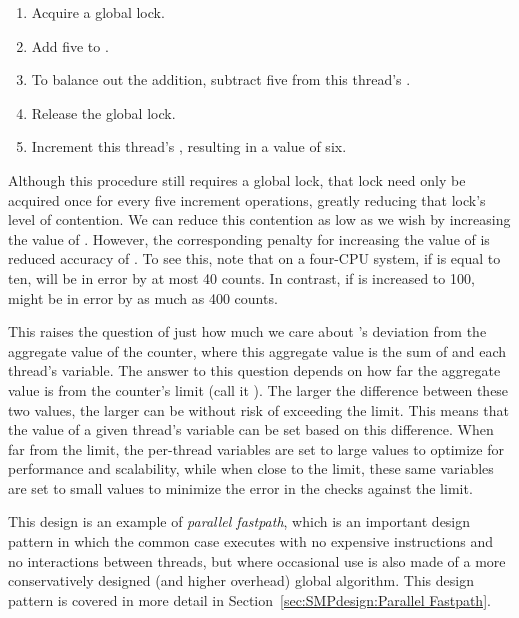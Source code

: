 \begin{enumerate}
\item	Acquire a global lock.
\item	Add five to .
\item	To balance out the addition, subtract five from this
	thread's .
\item	Release the global lock.
\item	Increment this thread's , resulting in a value of six.
\end{enumerate}

Although this procedure still requires a global lock, that lock need only be
acquired once for every five increment operations, greatly reducing
that lock's level of contention.
We can reduce this contention as low as we wish by increasing the
value of .
However, the corresponding penalty for increasing the value of
 is reduced accuracy of .
To see this, note that on a four-CPU system, if 
is equal to ten,  will be in error by at most
40 counts.
In contrast, if  is increased to 100, 
might be in error by as much as 400 counts.

This raises the question of just how much we care about 's
deviation from the aggregate value of the counter, where this aggregate value
is the sum of  and each thread's  variable.
The answer to this question depends on how far the aggregate value is
from the counter's limit (call it ).
The larger the difference between these two values, the larger 
can be without risk of exceeding the  limit.
This means that the
value of a given thread's  variable can be set
based on this difference.
When far from the limit, the  per-thread variables are
set to large values to optimize for performance and scalability, while
when close to the limit, these same variables are set to small values
to minimize the error in the checks against the  limit.

This design is an example of \emph{parallel fastpath}, which is an important
design pattern in which the common case executes with no expensive
instructions and no interactions between threads, but where occasional
use is also made of a more conservatively designed
(and higher overhead) global algorithm.
This design pattern is covered in more detail in
Section~\ref{sec:SMPdesign:Parallel Fastpath}.

